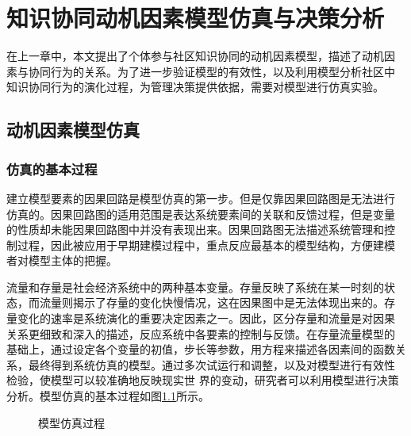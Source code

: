 
\chapter{知识协同动机因素模型仿真与决策分析}
\label{cha:emulation}

在上一章中，本文提出了个体参与社区知识协同的动机因素模型，描述了动机因
素与协同行为的关系。为了进一步验证模型的有效性，以及利用模型分析社区中
知识协同行为的演化过程，为管理决策提供依据，需要对模型进行仿真实验。

\section{动机因素模型仿真}

\subsection{仿真的基本过程}
建立模型要素的因果回路是模型仿真的第一步。但是仅靠因果回路图是无法进行
仿真的。因果回路图的适用范围是表达系统要素间的关联和反馈过程，但是变量
的性质却未能因果回路图中并没有表现出来。因果回路图无法描述系统管理和控
制过程，因此被应用于早期建模过程中，重点反应最基本的模型结构，方便建模
者对模型主体的把握。

流量和存量是社会经济系统中的两种基本变量。存量反映了系统在某一时刻的状
态，而流量则揭示了存量的变化快慢情况，这在因果图中是无法体现出来的。存
量变化的速率是系统演化的重要决定因素之一。因此，区分存量和流量是对因果
关系更细致和深入的描述，反应系统中各要素的控制与反馈。在存量流量模型的
基础上，通过设定各个变量的初值，步长等参数，用方程来描述各因素间的函数关
系，最终得到系统仿真的模型。通过多次试运行和调整，以及对模型进行有效性
检验，使模型可以较准确地反映现实世
界的变动，研究者可以利用模型进行决策分析。模型仿真的基本过程如图\ref{fig:vensim}所示。
\begin{figure}[htb]
  \centering
  \caption{模型仿真过程}
  \label{fig:vensim}
\end{figure}
